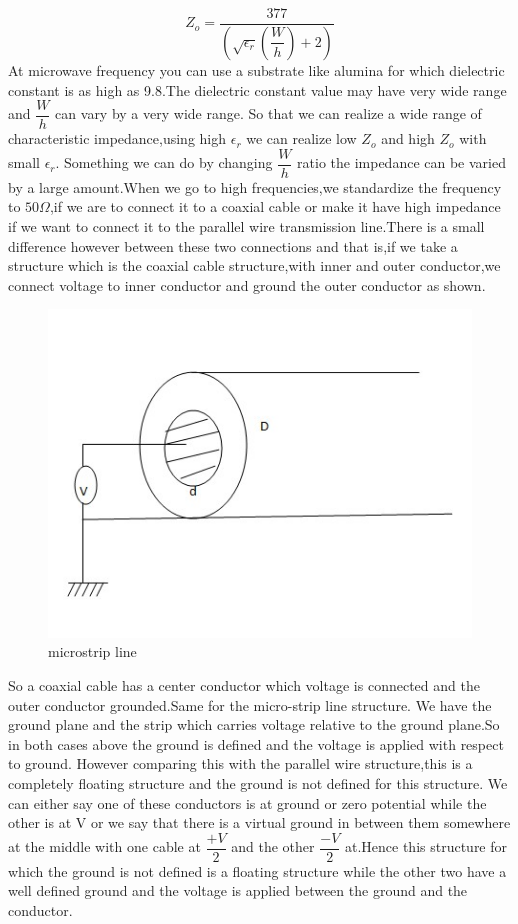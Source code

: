 \begin{equation*}
Z_o=\dfrac{377}{(\sqrt{\epsilon_r}( \dfrac{W}{h})+2)}
\end{equation*}
At microwave frequency you can use a substrate like alumina for which dielectric constant is as high as 9.8.The dielectric constant value may have very wide range and $\dfrac{W}{h}$ can vary by a very wide range. So that we can realize a wide range of characteristic impedance,using high $\epsilon_r$ we can realize low $Z_o$ and high $Z_o$ with small $\epsilon_r$.
Something we can do by changing $\dfrac{W}{h}$ ratio the impedance can be varied by a large amount.When we go to high frequencies,we standardize the frequency to  $50\Omega$,if we are to connect it to a coaxial cable or make it have high impedance if we want to connect it to the parallel wire transmission line.There is a small difference however between these two connections and that is,if we take a structure which is the coaxial cable structure,with inner and outer conductor,we connect voltage to inner conductor and ground the outer conductor as shown.\\
\begin{figure}[h]
\centering
\includegraphics[width=1\linewidth]{./graphics/ground}
\caption{microstrip line}
\end{figure}
So a coaxial cable has a center conductor which voltage is connected and the outer conductor grounded.Same for the micro-strip line structure. 
We have the ground plane and the strip which carries voltage relative to the ground plane.So in both cases above the ground is defined and the voltage is applied with respect to ground. However comparing this with the parallel wire structure,this is a completely floating structure and the ground is not defined for this structure. We can either say one of these conductors is at ground or zero potential while the other is at V or we say that  there is a virtual ground in between them somewhere at the middle with one cable at $\dfrac{+V}{2}$ and the other $\dfrac{-V}{2}$ at.Hence this structure for which the ground is not defined is a floating structure while the other two have a well defined ground and the voltage is applied between the ground and the conductor.

